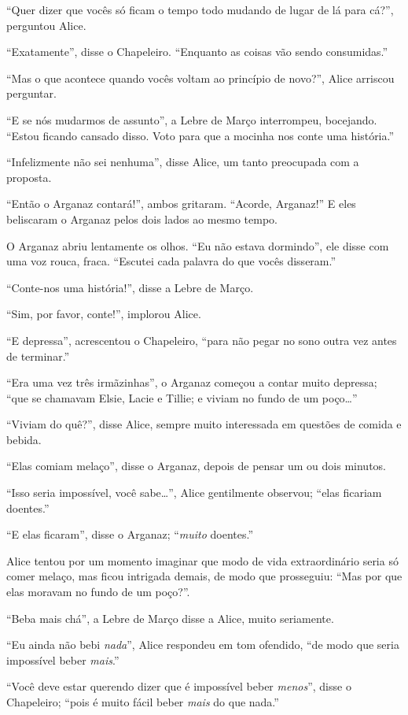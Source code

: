 ``Quer dizer que vocês só ficam o tempo todo mudando de lugar de lá para
cá?'', perguntou Alice.

``Exatamente'', disse o Chapeleiro. ``Enquanto as coisas vão sendo
consumidas.''

``Mas o que acontece quando vocês voltam ao princípio de novo?'', Alice
arriscou perguntar.

``E se nós mudarmos de assunto'', a Lebre de Março interrompeu,
bocejando. ``Estou ficando cansado disso. Voto para que a mocinha nos
conte uma história.''

``Infelizmente não sei nenhuma'', disse Alice, um tanto preocupada com a
proposta.

``Então o Arganaz contará!'', ambos gritaram. ``Acorde, Arganaz!'' E
eles beliscaram o Arganaz pelos dois lados ao mesmo tempo.

O Arganaz abriu lentamente os olhos. ``Eu não estava dormindo'', ele
disse com uma voz rouca, fraca. ``Escutei cada palavra do que vocês
disseram.''

``Conte-nos uma história!'', disse a Lebre de Março.

``Sim, por favor, conte!'', implorou Alice.

``E depressa'', acrescentou o Chapeleiro, ``para não pegar no sono outra
vez antes de terminar.''

``Era uma vez três irmãzinhas'', o Arganaz começou a contar muito
depressa; ``que se chamavam Elsie, Lacie e Tillie; e viviam no fundo de
um poço\ldots{}''

``Viviam do quê?'', disse Alice, sempre muito interessada em questões de
comida e bebida.

``Elas comiam melaço'', disse o Arganaz, depois de pensar um ou dois
minutos.

``Isso seria impossível, você sabe\ldots{}'', Alice gentilmente observou;
``elas ficariam doentes.''

``E elas ficaram'', disse o Arganaz; ``\emph{muito} doentes.''

Alice tentou por um momento imaginar que modo de vida extraordinário
seria só comer melaço, mas ficou intrigada demais, de modo que
prosseguiu: ``Mas por que elas moravam no fundo de um poço?''.

``Beba mais chá'', a Lebre de Março disse a Alice, muito seriamente.

``Eu ainda não bebi \emph{nada}'', Alice respondeu em tom ofendido, ``de
modo que seria impossível beber \emph{mais}.''

``Você deve estar querendo dizer que é impossível beber \emph{menos}'',
disse o Chapeleiro; ``pois é muito fácil beber \emph{mais} do que
nada.''

